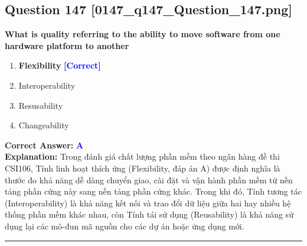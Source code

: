 \documentclass[11pt,a4paper]{article}
\begin{document}
\begin{minipage}{\textwidth}
\subsection*{Question 147 \quad \footnotesize{[0147\_q147\_Question\_147.png]}}
\noindent \textbf{What is quality referring to the ability to move software from one hardware platform to another}

\begin{enumerate}[label=\Alph*.]
    \item \textbf{Flexibility} \hfill \textcolor{blue}{\textbf{[Correct]}}
    \item Interoperability
    \item Resusability
    \item Changeability
\end{enumerate}

\noindent \textbf{Correct Answer:} \textcolor{blue}{\textbf{A}} \\[2pt]
\noindent \textbf{Explanation:} Trong đánh giá chất lượng phần mềm theo ngân hàng đề thi CSI106, Tính linh hoạt thích ứng (Flexibility, đáp án A) được định nghĩa là thước đo khả năng dễ dàng chuyển giao, cài đặt và vận hành phần mềm từ nền tảng phần cứng này sang nền tảng phần cứng khác. Trong khi đó, Tính tương tác (Interoperability) là khả năng kết nối và trao đổi dữ liệu giữa hai hay nhiều hệ thống phần mềm khác nhau, còn Tính tái sử dụng (Reusability) là khả năng sử dụng lại các mô-đun mã nguồn cho các dự án hoặc ứng dụng mới.

\par\vspace{0.3cm}
\hrule
\vspace{0.3cm}
\end{minipage}
\end{document}
